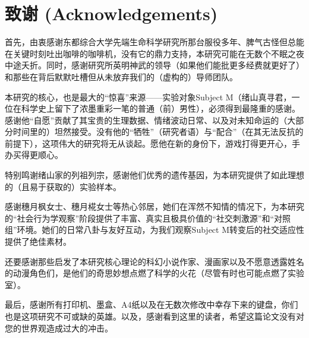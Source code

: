
\section*{致谢 (Acknowledgements)}

首先，由衷感谢东都综合大学先端生命科学研究所那台服役多年、脾气古怪但总能在关键时刻吐出咖啡的咖啡机，没有它的鼎力支持，本研究可能在无数个不眠之夜中途夭折。同时，感谢研究所英明神武的领导（如果他们能批更多经费就更好了）和那些在背后默默吐槽但从未放弃我们的（虚构的）导师团队。

本研究的核心，也是最大的“惊喜”来源——实验对象Subject M（绪山真寻君，一位在科学史上留下了浓墨重彩一笔的普通（前）男性），必须得到最隆重的感谢。感谢他“自愿”贡献了其宝贵的生理数据、情绪波动日常、以及对未知命运的（大部分时间里的）坦然接受。没有他的“牺牲”（研究者语）与“配合”（在其无法反抗的前提下），这项伟大的研究将无从谈起。愿他在新的身份下，游戏打得更开心，手办买得更顺心。

特别鸣谢绪山家的列祖列宗，感谢他们优秀的遗传基因，为本研究提供了如此理想的（且易于获取的）实验样本。

感谢穗月枫女士、穗月椛女士等热心邻居，她们在浑然不知情的情况下，为本研究的“社会行为学观察”阶段提供了丰富、真实且极具价值的“社交刺激源”和“对照组”环境。她们的日常八卦与友好互动，为我们观察Subject M转变后的社交适应性提供了绝佳素材。

还要感谢那些启发了本研究核心理论的科幻小说作家、漫画家以及不愿意透露姓名的动漫角色们，是他们的奇思妙想点燃了科学的火花（尽管有时也可能点燃了实验室）。

最后，感谢所有打印机、墨盒、A4纸以及在无数次修改中幸存下来的键盘，你们也是这项研究不可或缺的英雄。以及，感谢看到这里的读者，希望这篇论文没有对您的世界观造成过大的冲击。